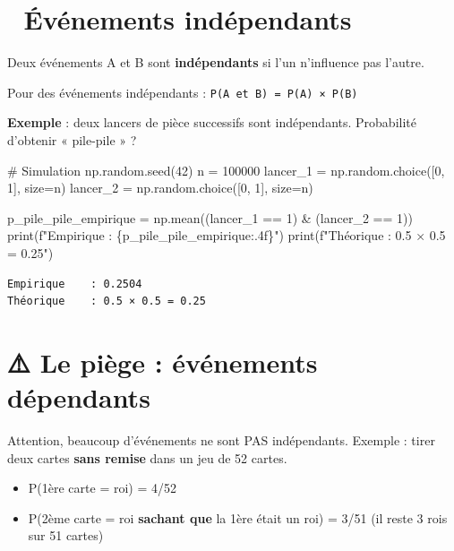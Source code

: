 \documentclass[
  french,
  11pt,
  a4paper,
]{scrbook}
\newenvironment{Shaded}{}{}
\newcommand{\BuiltInTok}[1]{\textcolor[rgb]{0.84,0.23,0.29}{#1}}
\newcommand{\CommentTok}[1]{\textcolor[rgb]{0.42,0.45,0.49}{#1}}
\newcommand{\DecValTok}[1]{\textcolor[rgb]{0.00,0.36,0.77}{#1}}
\newcommand{\NormalTok}[1]{\textcolor[rgb]{0.14,0.16,0.18}{#1}}
\newcommand{\OperatorTok}[1]{\textcolor[rgb]{0.14,0.16,0.18}{#1}}
\newcommand{\SpecialCharTok}[1]{\textcolor[rgb]{0.00,0.36,0.77}{#1}}
\newcommand{\SpecialStringTok}[1]{\textcolor[rgb]{0.01,0.18,0.38}{#1}}
\providecommand{\tightlist}{%
  \setlength{\itemsep}{0pt}\setlength{\parskip}{0pt}}
\begin{document}
\section{🔗 Événements
indépendants}\label{uxe9vuxe9nements-induxe9pendants}

Deux événements A et B sont \textbf{indépendants} si l'un n'influence
pas l'autre.

Pour des événements indépendants :
\texttt{P(A\ et\ B)\ =\ P(A)\ ×\ P(B)}

\textbf{Exemple} : deux lancers de pièce successifs sont indépendants.
Probabilité d'obtenir « pile-pile » ?

\begin{Shaded}
\begin{Highlighting}[]
\CommentTok{\# Simulation}
\NormalTok{np.random.seed(}\DecValTok{42}\NormalTok{)}
\NormalTok{n }\OperatorTok{=} \DecValTok{100000}
\NormalTok{lancer\_1 }\OperatorTok{=}\NormalTok{ np.random.choice([}\DecValTok{0}\NormalTok{, }\DecValTok{1}\NormalTok{], size}\OperatorTok{=}\NormalTok{n)}
\NormalTok{lancer\_2 }\OperatorTok{=}\NormalTok{ np.random.choice([}\DecValTok{0}\NormalTok{, }\DecValTok{1}\NormalTok{], size}\OperatorTok{=}\NormalTok{n)}

\NormalTok{p\_pile\_pile\_empirique }\OperatorTok{=}\NormalTok{ np.mean((lancer\_1 }\OperatorTok{==} \DecValTok{1}\NormalTok{) }\OperatorTok{\&}\NormalTok{ (lancer\_2 }\OperatorTok{==} \DecValTok{1}\NormalTok{))}
\BuiltInTok{print}\NormalTok{(}\SpecialStringTok{f"Empirique    : }\SpecialCharTok{\{}\NormalTok{p\_pile\_pile\_empirique}\SpecialCharTok{:.4f\}}\SpecialStringTok{"}\NormalTok{)}
\BuiltInTok{print}\NormalTok{(}\SpecialStringTok{f"Théorique    : 0.5 × 0.5 = 0.25"}\NormalTok{)}
\end{Highlighting}
\end{Shaded}

\begin{verbatim}
Empirique    : 0.2504
Théorique    : 0.5 × 0.5 = 0.25
\end{verbatim}

\section{⚠️ Le piège : événements
dépendants}\label{le-piuxe8ge-uxe9vuxe9nements-duxe9pendants}

Attention, beaucoup d'événements ne sont PAS indépendants. Exemple :
tirer deux cartes \textbf{sans remise} dans un jeu de 52 cartes.

\begin{itemize}
\tightlist
\item
  P(1ère carte = roi) = 4/52
\item
  P(2ème carte = roi \textbf{sachant que} la 1ère était un roi) = 3/51
  (il reste 3 rois sur 51 cartes)
\end{itemize}
\end{document}

